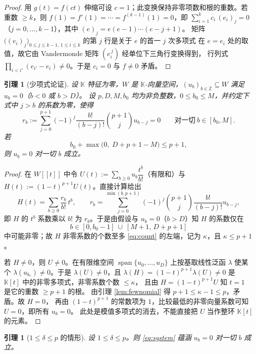\documentclass[11pt,UTF8]{ctexart}
\newtheorem{lemma}[theorem]{引理}
\theoremstyle{definition}
\newcommand{\Z}{\mathbb{Z}}
\newcommand{\K}{\mathbb{K}}
\begin{document}
\begin{proof}
用 $g(t)=f(ct)$ 伸缩可设 $c=1$；此变换保持非零项数和根的重数。若重数 $\ge k$，则 $f(1)=f'(1)=\cdots=f^{(k-1)}(1)=0$，即
$\sum_{i=1}^{k}c_i\,(e_i)_j=0$（$j=0,\dots,k-1$），其中 $(e)_j=e(e-1)\cdots(e-j+1)$。
矩阵 $\bigl((e_i)_j\bigr)_{0\le j\le k-1,\,1\le i\le k}$ 的第 $j$ 行是关于 $e$ 的首一 $j$ 次多项式
在 $e=e_i$ 处的取值，故它由 Vandermonde 矩阵 $(e_i^{\,j})$ 经单位下三角行变换得到，
行列式 $\prod_{i<i'}(e_{i'}-e_i)\ne0$。于是 $c_i=0$ 与 $f\ne0$ 矛盾。
\end{proof}

\begin{lemma}[少项式论证]\label{lem:gf}
设 $\K$ 特征为零，$W$ 是 $\K$-向量空间，$(u_b)_{b\in\Z}\subseteq W$ 满足 $u_b=0$（$b<0$ 或 $b>D$）。
设 $p,D,M,b_0$ 均为非负整数，$0\le b_0\le M$，并约定下式中 $j>b$ 的系数为零，使得
\[
r_b:=\sum_{j=0}^{p+1}(-1)^j\frac{b!}{(b-j)!}\binom{p+1}{j}u_{b-j}=0
\qquad\text{对一切}\ b\in[b_0,M].
\]
若
\begin{equation}\label{eq:count}
b_0+\max\bigl(0,\;D+p+1-M\bigr)\le p+1,
\end{equation}
则 $u_b=0$ 对一切 $b$ 成立。
\end{lemma}

\begin{proof}
在 $W[\![t]\!]$ 中令 $U(t):=\sum_{b\ge0}u_b\dfrac{t^b}{b!}$（有限和）与
$H(t):=(1-t)^{p+1}U(t)$。直接计算给出
\[
H(t)=\sum_{b\ge0}\frac{r_b}{b!}\,t^{b},\qquad
r_b=\sum_{j=0}^{\min(b,p+1)}(-1)^{j}\binom{p+1}{j}\frac{b!}{(b-j)!}u_{b-j},
\]
即 $H$ 的 $t^b$ 系数乘以 $b!$ 为 $r_b$。于是由假设与 $u_b=0$（$b>D$）知 $H$ 的系数仅在
\[
b\in[0,b_0-1]\ \cup\ [M+1,\,D+p+1]
\]
中可能非零；故 $H$ 非零系数的个数至多 \eqref{eq:count} 的左端，记为 $\kappa$，且
$\kappa\le p+1$。

若 $H\ne0$，则 $U\ne0$。在有限维空间 $\operatorname{span}\{u_0,\dots,u_D\}$ 上按基取线性泛函
$\lambda$ 使某个 $\lambda(u_{b_*})\ne0$。于是 $\lambda(U)\ne0$，且
$\lambda(H)=(1-t)^{p+1}\lambda(U)\ne0$ 是 $\K[t]$ 中的非零多项式，非零系数个数 $\le\kappa$，
且由 $H=(1-t)^{p+1}U$ 知 $t=1$ 是它的重数 $\ge p+1$ 的根。
由引理 \ref{lem:fewnomial} 得 $p+1\le\kappa-1\le p$，矛盾。故 $H=0$，
再由 $(1-t)^{p+1}$ 的常数项为 $1$，比较最低的非零向量系数可知 $U=0$，即所有 $u_b=0$。
此处是模值多项式的消去，不能直接把 $U$ 当作整环 $\K[t]$ 的元素。
\end{proof}

\begin{lemma}[$1\le\delta\le p$ 的情形]\label{lem:middle}
设 $1\le\delta\le p$。则 \eqref{eq:system} 蕴涵 $u_b=0$ 对一切 $b$ 成立。
\end{lemma}
\end{document}
